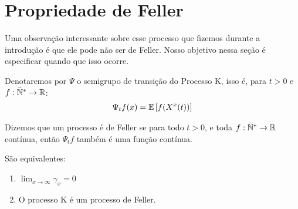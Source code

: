 
\section{Propriedade de Feller}
\label{sec:prop-feller}


Uma observação interessante sobre esse processo que fizemos durante a
introdução é que ele pode não ser de Feller. Nosso objetivo nessa
seção é especificar quando que isso ocorre.

\begin{definicao}
  \label{def:semigrupo}
  Denotaremos por $\Psi$ o semigrupo de transição do Processo K, isso
  é, para $t > 0$ e $f: {\mathbb{\bar{N}^*}} \to {\mathbb{R}}$:
  \begin{gather*}
    \Psi_t f (x) = {\mathbb{E}} \left[ f(X^x(t)) \right]\\
  \end{gather*}
\end{definicao}

Dizemos que um processo é de Feller se para todo $t > 0$, e toda $f:
{\mathbb{\bar{N}^*}} \to {\mathbb{R}}$ contínua, então $\Psi_t f$ também é uma função contínua.

\begin{proposicao}
  São equivalentes:
  \begin{enumerate}
  \item $\lim_{x \to \infty} \gamma_x = 0$
  \item O processo K é um processo de Feller.
  \end{enumerate}
\end{proposicao}

